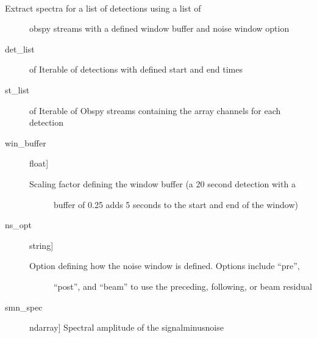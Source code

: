 \documentclass[letterpaper,10pt,english]{sphinxmanual}
\begin{document}

\begin{fulllineitems}
\label{\detokenize{infrapy.characterization:infrapy.characterization.spye.extract_spectra}}~\begin{description}
\item[{Extract spectra for a list of detections using a list of}] \leavevmode
obspy streams with a defined window buffer and noise
window option

\end{description}
\begin{description}
\item[{det\_list}] \leavevmode{[} of \sphinxcode{\sphinxupquote{InfrasoundDetection}}{]}
Iterable of detections with defined start and end times

\item[{st\_list}] \leavevmode{[} of \sphinxcode{\sphinxupquote{obspy.Stream}}{]}
Iterable of Obspy streams containing the array channels for each detection

\item[{win\_buffer}] \leavevmode{[}float{]}\begin{description}
\item[{Scaling factor defining the window buffer (a 20 second detection with a }] \leavevmode
buffer of 0.25 adds 5 seconds to the start and end of the window)

\end{description}

\item[{ns\_opt}] \leavevmode{[}string{]}\begin{description}
\item[{Option defining how the noise window is defined.  Options include “pre”,}] \leavevmode
“post”, and “beam” to use the preceding, following, or beam residual

\end{description}

\end{description}
\begin{description}
\item[{smn\_spec}] \leavevmode{[}ndarray{]}
Spectral amplitude of the signal\sphinxhyphen{}minus\sphinxhyphen{}noise

\end{description}

\end{fulllineitems}
\end{document}
